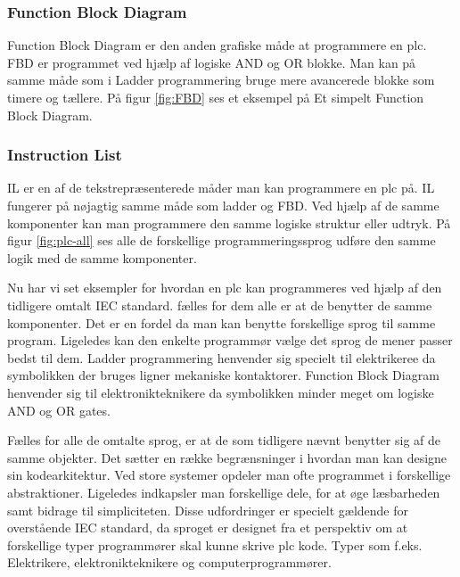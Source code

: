 
\subsubsection{Function Block Diagram}
Function Block Diagram er den anden grafiske måde at programmere en plc. FBD er programmet ved hjælp af logiske AND og OR blokke. Man kan på samme måde som i Ladder programmering bruge mere avancerede blokke som timere og tællere. På figur \ref{fig:FBD} ses et eksempel på Et simpelt Function Block Diagram.


\subsubsection{Instruction List}
IL er en af de tekstrepræsenterede måder man kan programmere en plc på. IL fungerer på nøjagtig samme måde som ladder og FBD. Ved hjælp af de samme komponenter kan man programmere den samme logiske struktur eller udtryk. På figur \ref{fig:plc-all} ses alle de forskellige programmeringssprog udføre den samme logik med de samme komponenter.


\noindent Nu har vi set eksempler for hvordan en plc kan programmeres ved hjælp af den tidligere omtalt IEC standard. fælles for dem alle er at de benytter de samme komponenter. Det er en fordel da man kan benytte forskellige sprog til samme program. Ligeledes kan den enkelte programmør vælge det sprog de mener passer bedst til dem. Ladder programmering henvender sig specielt til elektrikeree da symbolikken der bruges ligner mekaniske kontaktorer. Function Block Diagram henvender sig til elektronikteknikere da symbolikken minder meget om logiske AND og OR gates.

Fælles for alle de omtalte sprog, er at de som tidligere nævnt benytter sig af de samme objekter. Det sætter en række begrænsninger i hvordan man kan designe sin kodearkitektur. Ved store systemer opdeler man ofte programmet i forskellige abstraktioner. Ligeledes indkapsler man forskellige dele, for at øge læsbarheden samt bidrage til simpliciteten. Disse udfordringer er specielt gældende for overstående IEC standard, da sproget er designet fra et perspektiv om at forskellige typer programmører skal kunne skrive plc kode. Typer som f.eks. Elektrikere, elektronikteknikere og computerprogrammører.